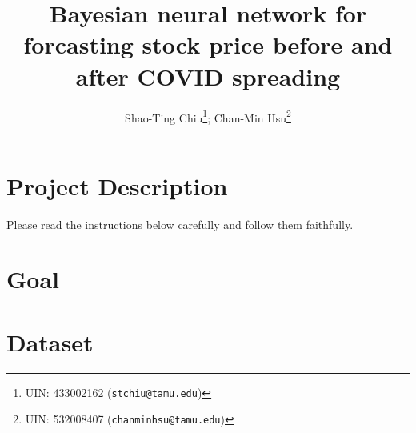 \documentclass{article}
\title{Bayesian neural network for forcasting stock price before and after COVID spreading}
\author{%
  Shao-Ting Chiu\thanks{UIN: 433002162 (\texttt{stchiu@tamu.edu})}; 
  Chan-Min Hsu\thanks{UIN: 532008407 (\texttt{chanminhsu@tamu.edu})}
}
\begin{document}
\maketitle


\section{Project Description}


Please read the instructions below carefully and follow them faithfully.

\section{Goal}

\section{Dataset}



\cite{braga2020fundamentals}


\end{document}
